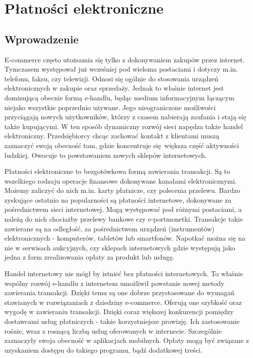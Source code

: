 \section{Płatności elektroniczne}


\subsection{Wprowadzenie}

E-commerce często utożsamia się tylko z dokonywaniem zakupów przez internet. Tymczasem występował już wcześniej pod wieloma postaciami i dotyczy m.in. telefonu, faksu, czy telewizji. Odnosi się ogólnie do stosowania urządzeń elektronicznych w zakupie oraz sprzedaży. Jednak to właśnie internet jest dominującą obecnie formą e-handlu, będąc medium informacyjnym łączącym niejako wszystkie poprzednio używane. Jego nieograniczone możliwości przyciągają nowych użytkowników, którzy z czasem nabierają zaufania i stają się także kupującymi. W ten sposób dynamiczny rozwój sieci napędza także handel elektroniczny. Przedsiębiorcy chcąc zachować kontakt z klientami muszą zaznaczyć swoją obecność tam, gdzie koncentruje się większa część aktywności ludzkiej. Owocuje to powstawaniem nowych sklepów internetowych.

Płatności elektroniczne to bezgotówkowa formą zawierania transakcji. Są to wszelkiego rodzaju operacje finansowe dokonywane kanałami elektronicznymi. Możemy zaliczyć do nich m.in. karty płatnicze, czy polecenia przelewu. Bardzo zyskujące ostatnio na popularności są płatności internetowe, dokonywane za pośrednictwem sieci internetowej. Mogą występować pod różnymi postaciami, a należą do nich chociażby przelewy bankowe czy e-portmonetki. Transakcje takie zawierane są na odległość, za pośrednictwem urządzeń (instrumentów) elektronicznych - komputerów, tabletów lub smartfonów. Napotkać można się na nie w serwisach aukcyjnych, czy sklepach internetowych gdzie występują jako jedna z form zrealizowania opłaty za produkt lub usługę. 

Handel internetowy nie mógł by istnieć bez płatności internetowych. To właśnie wspólny rozwój e-handlu z internetem umożliwił powstanie nowej metody zawierania transakcji. Dzięki temu są one dobrze przystosowane do wymagań stawianych w rozwiązaniach z dziedziny e-commerce. Oferują one szybkość oraz wygodę w zawieraniu transakcji. Dzięki coraz większej konkurencji pomiędzy dostawcami usług płatniczych - także korzystniejsze prowizję. Ich zastosowanie rośnie, wraz z rosnącą liczbą usług oferowanych w internecie. Szczególnie zaznaczyły swoja obecność w aplikacjach mobilnych. Opłaty mogą być związane z uzyskaniem dostępu do takiego programu, bądź dodatkowej treści.

